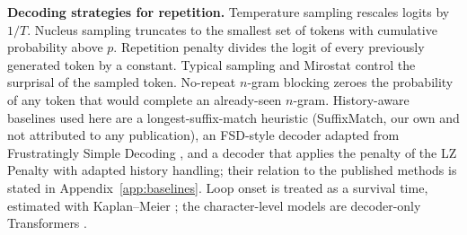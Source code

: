 \textbf{Decoding strategies for repetition.} Temperature sampling rescales logits by $1/T$. Nucleus sampling \cite{holtzman2020curious} truncates to the smallest set of tokens with cumulative probability above $p$. Repetition penalty \cite{keskar2019ctrl} divides the logit of every previously generated token by a constant. Typical sampling \cite{meister2023typical} and Mirostat \cite{basu2021mirostat} control the surprisal of the sampled token. No-repeat $n$-gram blocking \cite{paulus2018deep} zeroes the probability of any token that would complete an already-seen $n$-gram. History-aware baselines used here are a longest-suffix-match heuristic (SuffixMatch, our own and not attributed to any publication), an FSD-style decoder adapted from Frustratingly Simple Decoding \cite{yang2023frustratingly}, and a decoder that applies the penalty of the LZ Penalty \cite{ginart2025lzpenalty} with adapted history handling; their relation to the published methods is stated in Appendix~\ref{app:baselines}. Loop onset is treated as a survival time, estimated with Kaplan--Meier \cite{kaplan1958nonparametric}; the character-level models are decoder-only Transformers \cite{vaswani2017attention}.
